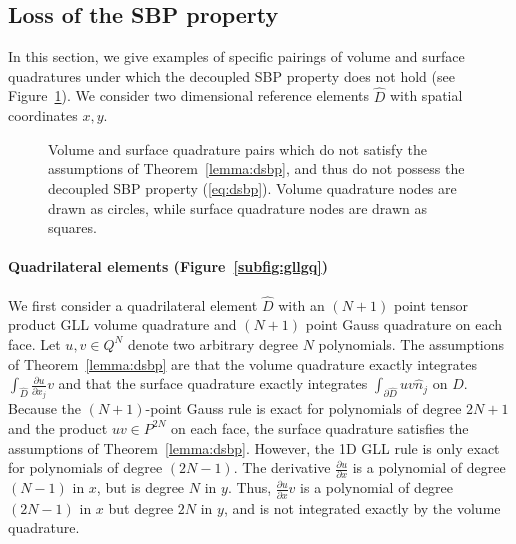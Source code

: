 \documentclass{svjour3}                     %
\renewcommand{\hat}{\widehat}
\newcommand{\pd}[2]{\frac{\partial#1}{\partial#2}}
\begin{document}
\subsection{Loss of the SBP property}

In this section, we give examples of specific pairings of volume and surface quadratures under which the decoupled SBP property does not hold (see Figure~\ref{fig:sbploss}).  We consider two dimensional reference elements $\hat{D}$ with spatial coordinates $x,y$.
\begin{figure}
\centering
{}
\hspace{2em}
\caption{Volume and surface quadrature pairs which do not satisfy the assumptions of Theorem~\ref{lemma:dsbp}, and thus do not possess the decoupled SBP property (\ref{eq:dsbp}). Volume quadrature nodes are drawn as circles, while surface quadrature nodes are drawn as squares.}
\label{fig:sbploss}
\end{figure}

\paragraph{Quadrilateral elements (Figure~\ref{subfig:gllgq})} We first consider a quadrilateral element $\hat{D}$ with an $(N+1)$ point tensor product GLL volume quadrature and $(N+1)$ point Gauss quadrature on each face.  Let $u,v \in Q^N$ denote two arbitrary degree $N$ polynomials.  The assumptions of Theorem~\ref{lemma:dsbp} are that the volume quadrature exactly integrates $\int_{\hat{D}} \pd{u}{x_j} v$ and that the surface quadrature exactly integrates $\int_{\partial \hat{D}} u v \hat{n}_j$ on $\hat{D}$.  Because the $(N+1)$-point Gauss rule is exact for polynomials of degree $2N+1$ and the product $uv \in P^{2N}$ on each face, the surface quadrature satisfies the assumptions of Theorem~\ref{lemma:dsbp}.  However, the 1D GLL rule is only exact for polynomials of degree $(2N-1)$.  The derivative $\pd{u}{x}$ is a polynomial of degree $(N-1)$ in $x$, but is degree $N$ in $y$.  Thus, $\pd{u}{x}v$ is a polynomial of degree $(2N-1)$ in $x$ but degree $2N$ in $y$, and is not integrated exactly by the volume quadrature.  
\end{document}
